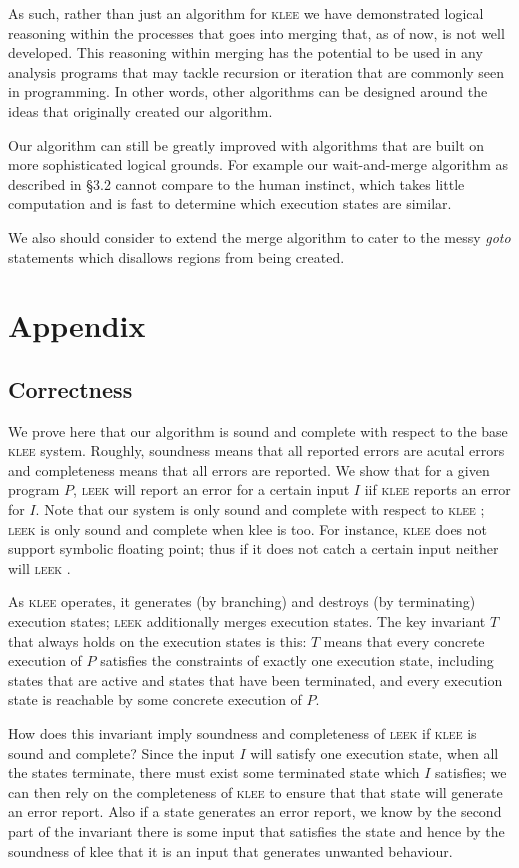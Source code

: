 \documentclass[12pt,a4paper]{article}
\newcommand{\klee}{\textsc{klee }}
\newcommand{\leek}{\textsc{leek }}
\begin{document}
As such, rather than just an algorithm for \klee we have demonstrated logical reasoning within the processes that goes into merging that, as of now, is not well developed. This reasoning within merging has the potential to be used in any analysis programs that may tackle recursion or iteration that are commonly seen in programming. In other words, other algorithms can be designed around the ideas that originally created our algorithm.

Our algorithm can still be greatly improved with algorithms that are built on more sophisticated logical grounds. For example our wait-and-merge algorithm as described in \S 3.2 cannot compare to the human instinct, which takes little computation and is fast to determine which execution states are similar.

We also should consider to extend the merge algorithm to cater to the messy \emph{goto} statements which disallows regions from being created. 

\section{Appendix}

\subsection{Correctness}

We prove here that our algorithm is sound and complete with respect to the base \klee system. Roughly, soundness means that all reported errors are acutal errors and completeness means that all errors are reported. We show that for a given program $P$, \leek will report an error for a certain input $I$ iif \klee reports an error for $I$. Note that our system is only sound and complete with respect to \klee; \leek is only sound and complete when klee is too. For instance, \klee does not support symbolic floating point; thus if it does not catch a certain input neither will \leek.

As \klee operates, it generates (by branching) and destroys (by terminating) execution states; \leek additionally merges execution states. The key invariant $T$ that always holds on the execution states is this: $T$ means that every concrete execution of $P$ satisfies the constraints of exactly one execution state, including states that are active and states that have been terminated, and every execution state is reachable by some concrete execution of $P$.

How does this invariant imply soundness and completeness of \leek if \klee is sound and complete? Since the input $I$ will satisfy one execution state, when all the states terminate, there must exist some terminated state which $I$ satisfies; we can then rely on the completeness of \klee to ensure that that state will generate an error report. Also if a state generates an error report, we know by the second part of the invariant there is some input that satisfies the state and hence by the soundness of klee that it is an input that generates unwanted behaviour.
\end{document}
